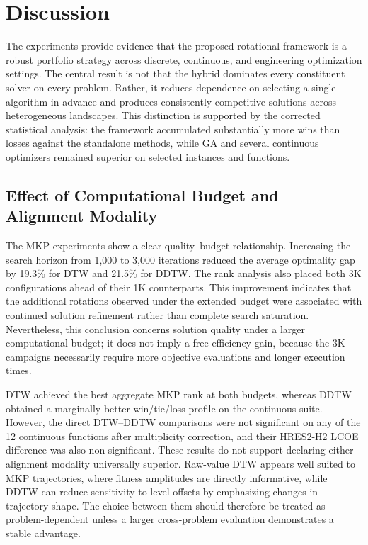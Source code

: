 \section{Discussion}
\label{sec:discussion}

The experiments provide evidence that the proposed rotational framework is a robust portfolio strategy across discrete, continuous, and engineering optimization settings. The central result is not that the hybrid dominates every constituent solver on every problem. Rather, it reduces dependence on selecting a single algorithm in advance and produces consistently competitive solutions across heterogeneous landscapes. This distinction is supported by the corrected statistical analysis: the framework accumulated substantially more wins than losses against the standalone methods, while GA and several continuous optimizers remained superior on selected instances and functions.

\subsection{Effect of Computational Budget and Alignment Modality}
\label{sec:discussion_budget_alignment}

The MKP experiments show a clear quality--budget relationship. Increasing the search horizon from 1,000 to 3,000 iterations reduced the average optimality gap by 19.3\% for DTW and 21.5\% for DDTW. The rank analysis also placed both 3K configurations ahead of their 1K counterparts. This improvement indicates that the additional rotations observed under the extended budget were associated with continued solution refinement rather than complete search saturation. Nevertheless, this conclusion concerns solution quality under a larger computational budget; it does not imply a free efficiency gain, because the 3K campaigns necessarily require more objective evaluations and longer execution times.

DTW achieved the best aggregate MKP rank at both budgets, whereas DDTW obtained a marginally better win/tie/loss profile on the continuous suite. However, the direct DTW--DDTW comparisons were not significant on any of the 12 continuous functions after multiplicity correction, and their HRES2-H2 LCOE difference was also non-significant. These results do not support declaring either alignment modality universally superior. Raw-value DTW appears well suited to MKP trajectories, where fitness amplitudes are directly informative, while DDTW can reduce sensitivity to level offsets by emphasizing changes in trajectory shape. The choice between them should therefore be treated as problem-dependent unless a larger cross-problem evaluation demonstrates a stable advantage.

